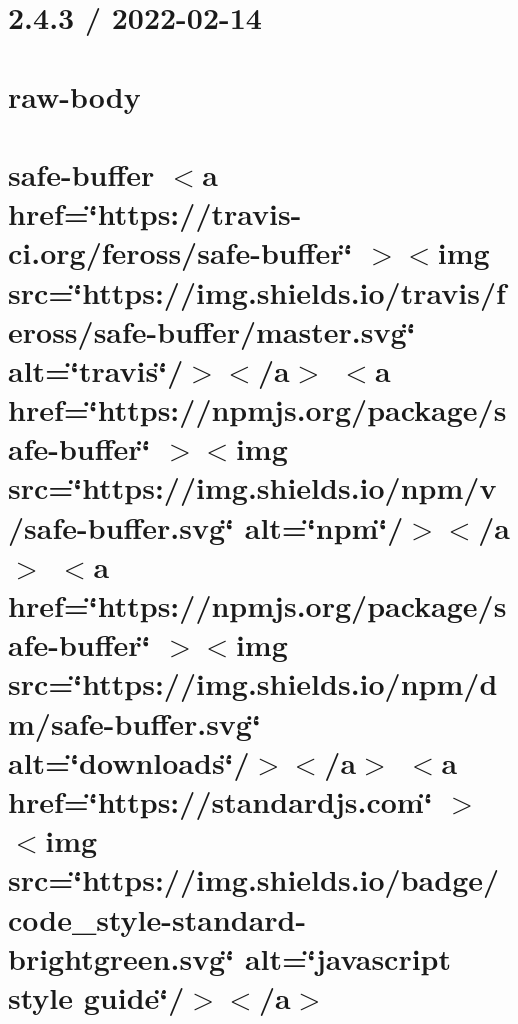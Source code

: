 \documentclass[twoside]{book}
\newcommand{\+}{\discretionary{\mbox{\scriptsize$\hookleftarrow$}}{}{}}
\begin{document}
\chapter{2.4.3 / 2022-\/02-\/14}
\label{md__c___users_vaishnavi_jadhav__desktop__developer_code_mean_stack_example_server_node_modules_raw_body__h_i_s_t_o_r_y}

\chapter{raw-\/body}
\label{md__c___users_vaishnavi_jadhav__desktop__developer_code_mean_stack_example_server_node_modules_raw_body__r_e_a_d_m_e}

\chapter{safe-\/buffer \texorpdfstring{$<$}{<}a href=\char`\"{}https\+://travis-\/ci.\+org/feross/safe-\/buffer\char`\"{} \texorpdfstring{$>$}{>}\texorpdfstring{$<$}{<}img src=\char`\"{}https\+://img.\+shields.\+io/travis/feross/safe-\/buffer/master.\+svg\char`\"{} alt=\char`\"{}travis\char`\"{}/\texorpdfstring{$>$}{>}\texorpdfstring{$<$}{<}/a\texorpdfstring{$>$}{>} \texorpdfstring{$<$}{<}a href=\char`\"{}https\+://npmjs.\+org/package/safe-\/buffer\char`\"{} \texorpdfstring{$>$}{>}\texorpdfstring{$<$}{<}img src=\char`\"{}https\+://img.\+shields.\+io/npm/v/safe-\/buffer.\+svg\char`\"{} alt=\char`\"{}npm\char`\"{}/\texorpdfstring{$>$}{>}\texorpdfstring{$<$}{<}/a\texorpdfstring{$>$}{>} \texorpdfstring{$<$}{<}a href=\char`\"{}https\+://npmjs.\+org/package/safe-\/buffer\char`\"{} \texorpdfstring{$>$}{>}\texorpdfstring{$<$}{<}img src=\char`\"{}https\+://img.\+shields.\+io/npm/dm/safe-\/buffer.\+svg\char`\"{} alt=\char`\"{}downloads\char`\"{}/\texorpdfstring{$>$}{>}\texorpdfstring{$<$}{<}/a\texorpdfstring{$>$}{>} \texorpdfstring{$<$}{<}a href=\char`\"{}https\+://standardjs.\+com\char`\"{} \texorpdfstring{$>$}{>}\texorpdfstring{$<$}{<}img src=\char`\"{}https\+://img.\+shields.\+io/badge/code\+\_\+style-\/standard-\/brightgreen.\+svg\char`\"{} alt=\char`\"{}javascript style guide\char`\"{}/\texorpdfstring{$>$}{>}\texorpdfstring{$<$}{<}/a\texorpdfstring{$>$}{>}}
\label{md__c___users_vaishnavi_jadhav__desktop__developer_code_mean_stack_example_server_node_modules_safe_buffer__r_e_a_d_m_e}

\end{document}
